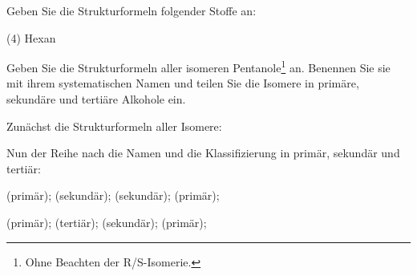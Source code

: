 \documentclass[DIV11]{scrartcl}
\begin{document}
\begin{question}[name=Strukturformeln I]
Geben Sie die Strukturformeln folgender Stoffe an:
\begin{tasks}(4)
  \task Hexan
  \task {}
  \task {}
  \task {}
\end{tasks}
\end{question}
\begin{solution}[name=Strukturformeln I]
\begin{tasks}
  \task {}
  \task {}
  \task {}
  \task {}
\end{tasks}
\end{solution}

\begin{question}[name=Strukturformeln II]
Geben Sie die Strukturformeln aller isomeren Pentanole\footnote{Ohne Beachten
  der R/S-Isomerie.} an.  Benennen Sie sie mit ihrem systematischen Namen und
teilen Sie die Isomere in primäre, sekundäre und tertiäre Alkohole ein.
\end{question}
\begin{solution}[name=Strukturformeln II]
Zunächst die Strukturformeln aller Isomere:

\quad
{}\quad
{}\quad
{}

\quad
{}\quad
{}\quad
{}

\noindent
Nun der Reihe nach die Namen und die Klassifizierung in primär, sekundär und
tertiär:

 (primär);  (sekundär);
 (sekundär);  (primär);

 (primär); 
(tertiär);  (sekundär);
 (primär); 
\end{solution}
\end{document}
